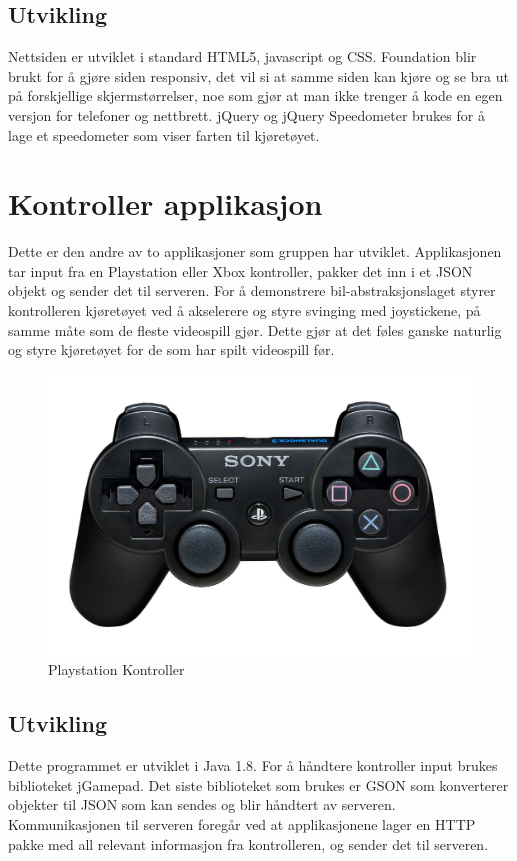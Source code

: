 \documentclass[12pt]{report}
\begin{document}
\subsection{Utvikling}
Nettsiden er utviklet i standard HTML5, javascript og CSS. Foundation\cite{Foundation} blir brukt for å gjøre siden responsiv, det vil si at samme siden kan kjøre og se bra ut på forskjellige skjermstørrelser, noe som gjør at man ikke trenger å kode en egen versjon for telefoner og nettbrett. jQuery\cite{jQuery} og jQuery Speedometer\cite{jQuerySpeed} brukes for å lage et speedometer som viser farten til kjøretøyet.

\section{Kontroller applikasjon}
Dette er den andre av to applikasjoner som gruppen har utviklet. Applikasjonen tar input fra en Playstation eller Xbox kontroller, pakker det inn i et JSON objekt og sender det til serveren. For å demonstrere bil-abstraksjonslaget styrer kontrolleren kjøretøyet ved å akselerere og styre svinging med joystickene, på samme måte som de fleste videospill gjør. Dette gjør at det føles ganske naturlig og styre kjøretøyet for de som har spilt videospill før.

\begin{figure}[H]
	\includegraphics[scale=0.15]{imgs/Playstation}
	\centering
	\caption{Playstation Kontroller}
	\label{playstat}
\end{figure}

\subsection{Utvikling}
Dette programmet er utviklet i Java 1.8\cite{Java}. For å håndtere kontroller input brukes biblioteket jGamepad\cite{jGamepad}. Det siste biblioteket som brukes er GSON\cite{GSON} som konverterer objekter til JSON som kan sendes og blir håndtert av serveren. Kommunikasjonen til serveren foregår ved at applikasjonene lager en HTTP pakke med all relevant informasjon fra kontrolleren, og sender det til serveren.
\end{document}
